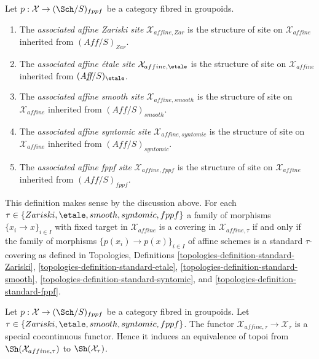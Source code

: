 \begin{definition}
\label{definition-alternative-inherited-topologies}
Let $p : \mathcal{X} \to (\Sch/S)_{fppf}$ be a category fibred in groupoids.
\begin{enumerate}
\item The {\it associated affine Zariski site} $\mathcal{X}_{affine, Zar}$
is the structure of site on $\mathcal{X}_{affine}$ inherited from
$(\textit{Aff}/S)_{Zar}$.
\item The {\it associated affine \'etale site} $\mathcal{X}_{affine, \etale}$
is the structure of site on $\mathcal{X}_{affine}$ inherited from
$(\textit{Aff}/S)_\etale$.
\item The {\it associated affine smooth site}
$\mathcal{X}_{affine, smooth}$
is the structure of site on $\mathcal{X}_{affine}$ inherited from
$(\textit{Aff}/S)_{smooth}$.
\item The {\it associated affine syntomic site} $\mathcal{X}_{affine, syntomic}$
is the structure of site on $\mathcal{X}_{affine}$ inherited from
$(\textit{Aff}/S)_{syntomic}$.
\item The {\it associated affine fppf site} $\mathcal{X}_{affine, fppf}$
is the structure of site on $\mathcal{X}_{affine}$ inherited from
$(\textit{Aff}/S)_{fppf}$.
\end{enumerate}
\end{definition}

\noindent
This definition makes sense by the discussion above. For each
$\tau \in \{Zariski, \etale, smooth, syntomic, fppf\}$ a
family of morphisms $\{x_i \to x\}_{i \in I}$ with fixed target
in $\mathcal{X}_{affine}$ is a covering in $\mathcal{X}_{affine, \tau}$
if and only if the family of morphisms $\{p(x_i) \to p(x)\}_{i \in I}$
of affine schemes is a standard $\tau$-covering as defined in
Topologies, Definitions
\ref{topologies-definition-standard-Zariski},
\ref{topologies-definition-standard-etale},
\ref{topologies-definition-standard-smooth},
\ref{topologies-definition-standard-syntomic}, and
\ref{topologies-definition-standard-fppf}.

\begin{lemma}
\label{lemma-alternative}
Let $p : \mathcal{X} \to (\Sch/S)_{fppf}$ be a category fibred in groupoids.
Let $\tau \in \{Zariski, \etale, smooth, syntomic, fppf\}$. The functor
$\mathcal{X}_{affine, \tau} \to \mathcal{X}_\tau$ is a special
cocontinuous functor. Hence it induces an equivalence of topoi
from $\Sh(\mathcal{X}_{affine, \tau})$ to $\Sh(\mathcal{X}_\tau)$.
\end{lemma}

